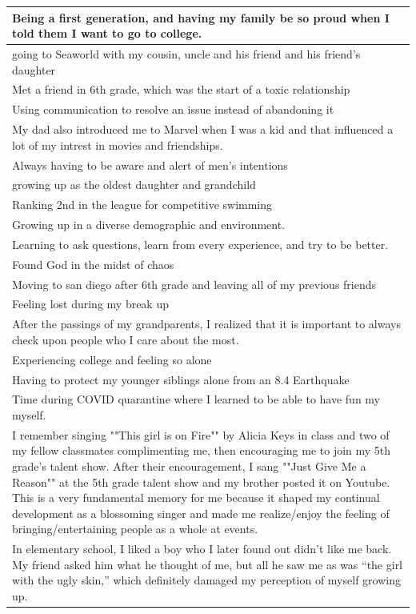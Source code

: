 \documentclass[
  .7em,
  letterpaper,
  DIV=11,
  numbers=noendperiod]{scrartcl}
\begin{document}
\begin{table}
\begin{tabular}{l}
\hline
Being a first generation, and having my family be so proud when I told them I want to go to college.\\
\hline
going to Seaworld with my cousin, uncle and his friend and his friend's daughter\\
\hline
Met a friend in 6th grade, which was the start of a toxic relationship\\
\hline
Using communication to resolve an issue instead of abandoning it\\
\hline
My dad also introduced me to Marvel when I was a kid and that influenced a lot of my intrest in movies and friendships.\\
\hline
Always having to be aware and alert of men's intentions\\
\hline
growing up as the oldest daughter and grandchild\\
\hline
Ranking 2nd in the league for competitive swimming\\
\hline
Growing up in a diverse demographic and environment.\\
\hline
Learning to ask questions, learn from every experience, and try to be better.\\
\hline
Found God in the midst of chaos\\
\hline
Moving to san diego after 6th grade and leaving all of my previous friends\\
\hline
Feeling lost during my break up\\
\hline
After the passings of my grandparents, I realized that it is important to always check upon people who I care about the most.\\
\hline
Experiencing college and feeling so alone\\
\hline
Having to protect my younger siblings alone from an 8.4 Earthquake\\
\hline
Time during COVID quarantine where I learned to be able to have fun my myself.\\
\hline
I remember singing ""This girl is on Fire"" by Alicia Keys in class and two of my fellow classmates complimenting me, then encouraging me to join my 5th grade's talent show. After their encouragement, I sang ""Just Give Me a Reason"" at the 5th grade talent show and my brother posted it on Youtube. This is a very fundamental memory for me because it shaped my continual development as a blossoming singer and made me realize/enjoy the feeling of bringing/entertaining people as a whole at events.\\
\hline
In elementary school, I liked a boy who I later found out didn’t like me back. My friend asked him what he thought of me, but all he saw me as was “the girl with the ugly skin,” which definitely damaged my perception of myself growing up.\\

\end{tabular}
\end{table}
\end{document}
